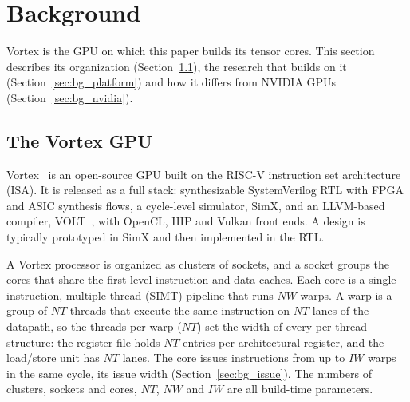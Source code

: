 \section{Background}
\label{sec:background}

Vortex is the GPU on which this paper builds its tensor cores. This section describes its organization (Section~\ref{sec:bg_hierarchy}), the research that builds on it (Section~\ref{sec:bg_platform}) and how it differs from NVIDIA GPUs (Section~\ref{sec:bg_nvidia}).

\subsection{The Vortex GPU}
\label{sec:bg_hierarchy}

Vortex~\cite{vortex} is an open-source GPU built on the RISC-V instruction set architecture (ISA). It is released as a full stack: synthesizable SystemVerilog RTL with FPGA and ASIC synthesis flows, a cycle-level simulator, SimX, and an LLVM-based compiler, VOLT~\cite{10.1145/3771775.3786275}, with OpenCL, HIP and Vulkan front ends. A design is typically prototyped in SimX and then implemented in the RTL.

A Vortex processor is organized as clusters of sockets, and a socket groups the cores that share the first-level instruction and data caches. Each core is a single-instruction, multiple-thread (SIMT) pipeline that runs $\mathit{NW}$ warps. A warp is a group of $\mathit{NT}$ threads that execute the same instruction on $\mathit{NT}$ lanes of the datapath, so the threads per warp ($\mathit{NT}$) set the width of every per-thread structure: the register file holds $\mathit{NT}$ entries per architectural register, and the load/store unit has $\mathit{NT}$ lanes. The core issues instructions from up to $\mathit{IW}$ warps in the same cycle, its issue width (Section~\ref{sec:bg_issue}). The numbers of clusters, sockets and cores, $\mathit{NT}$, $\mathit{NW}$ and $\mathit{IW}$ are all build-time parameters.

